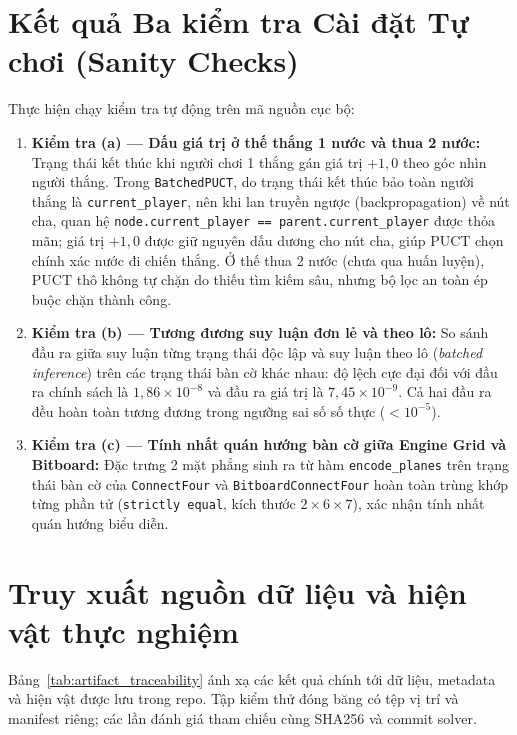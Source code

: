 \documentclass[11pt, a4paper]{article}
\begin{document}
\section{Kết quả Ba kiểm tra Cài đặt Tự chơi (Sanity Checks)}
Thực hiện chạy kiểm tra tự động trên mã nguồn cục bộ:
\begin{enumerate}
    \item \textbf{Kiểm tra (a) --- Dấu giá trị ở thế thắng 1 nước và thua 2 nước:}
    Trạng thái kết thúc khi người chơi 1 thắng gán giá trị $+1{,}0$ theo góc nhìn người thắng. Trong \texttt{BatchedPUCT}, do trạng thái kết thúc bảo toàn người thắng là \texttt{current\_player}, nên khi lan truyền ngược (backpropagation) về nút cha, quan hệ \texttt{node.current\_player == parent.current\_player} được thỏa mãn; giá trị $+1{,}0$ được giữ nguyên dấu dương cho nút cha, giúp PUCT chọn chính xác nước đi chiến thắng. Ở thế thua 2 nước (chưa qua huấn luyện), PUCT thô không tự chặn do thiếu tìm kiếm sâu, nhưng bộ lọc an toàn ép buộc chặn thành công.
    \item \textbf{Kiểm tra (b) --- Tương đương suy luận đơn lẻ và theo lô:}
    So sánh đầu ra giữa suy luận từng trạng thái độc lập và suy luận theo lô (\textit{batched inference}) trên các trạng thái bàn cờ khác nhau: độ lệch cực đại đối với đầu ra chính sách là $1{,}86 \times 10^{-8}$ và đầu ra giá trị là $7{,}45 \times 10^{-9}$. Cả hai đầu ra đều hoàn toàn tương đương trong ngưỡng sai số số thực ($<10^{-5}$).
    \item \textbf{Kiểm tra (c) --- Tính nhất quán hướng bàn cờ giữa Engine Grid và Bitboard:}
    Đặc trưng 2 mặt phẳng sinh ra từ hàm \texttt{encode\_planes} trên trạng thái bàn cờ của \texttt{ConnectFour} và \texttt{BitboardConnectFour} hoàn toàn trùng khớp từng phần tử (\texttt{strictly equal}, kích thước $2 \times 6 \times 7$), xác nhận tính nhất quán hướng biểu diễn.
\end{enumerate}

\section{Truy xuất nguồn dữ liệu và hiện vật thực nghiệm}
Bảng~\ref{tab:artifact_traceability} ánh xạ các kết quả chính tới dữ liệu,
metadata và hiện vật được lưu trong repo. Tập kiểm thử đóng băng có tệp vị trí
và manifest riêng; các lần đánh giá tham chiếu cùng SHA256 và commit solver.
\end{document}
